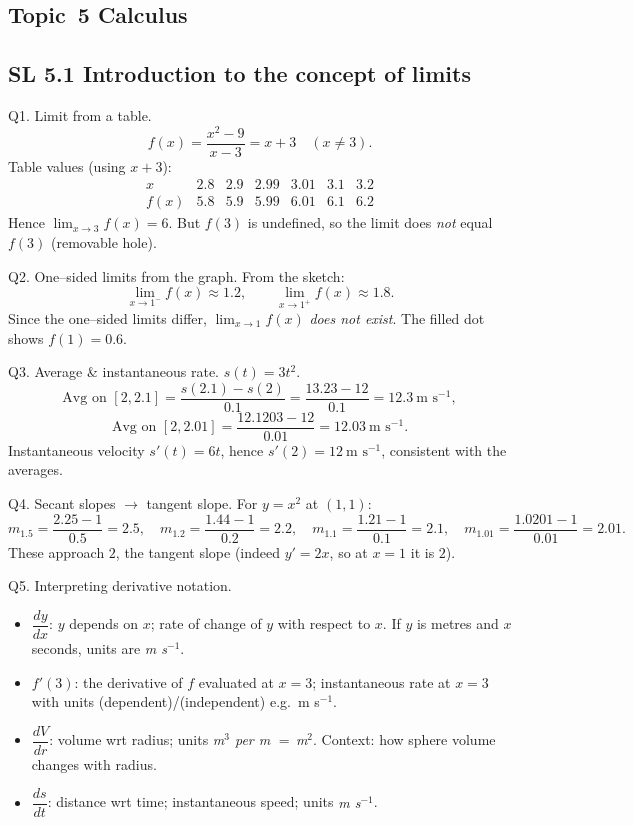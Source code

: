 \documentclass[11pt]{article}
\def\textbf#1{#1}%
\newcommand{\tocsubsection}[1]{\subsection{#1}}
\begin{document}
\tocsubsection{Topic 5 Calculus}
\tocsubsection{SL 5.1 Introduction to the concept of limits}


\begin{solution}
\textbf{Q1. Limit from a table.}
\[
f(x)=\frac{x^{2}-9}{x-3}=x+3\quad(x\ne3).
\]
Table values (using $x+3$):
\[
\begin{array}{c|cccccc}
x & 2.8 & 2.9 & 2.99 & 3.01 & 3.1 & 3.2\\\hline
f(x) & 5.8 & 5.9 & 5.99 & 6.01 & 6.1 & 6.2
\end{array}
\]
Hence $\displaystyle\lim_{x\to3}f(x)=\boxed{6}$.  
But $f(3)$ is undefined, so the limit does \emph{not} equal $f(3)$ (removable hole).
\end{solution}

\begin{solution}
\textbf{Q2. One–sided limits from the graph.}
From the sketch:
\[
\lim_{x\to1^-}f(x)\approx \boxed{1.2},\qquad
\lim_{x\to1^+}f(x)\approx \boxed{1.8}.
\]
Since the one–sided limits differ, $\displaystyle\lim_{x\to1}f(x)$ \emph{does not exist}.  
The filled dot shows $f(1)=\boxed{0.6}$.
\end{solution}

\begin{solution}
\textbf{Q3. Average \& instantaneous rate.}
$s(t)=3t^{2}$.
\[
\text{Avg on }[2,2.1]=\frac{s(2.1)-s(2)}{0.1}=\frac{13.23-12}{0.1}=\boxed{12.3\ \text{m s}^{-1}},
\]
\[
\text{Avg on }[2,2.01]=\frac{12.1203-12}{0.01}=\boxed{12.03\ \text{m s}^{-1}}.
\]
Instantaneous velocity $s'(t)=6t$, hence $s'(2)=\boxed{12\ \text{m s}^{-1}}$, consistent with the averages.
\end{solution}

\begin{solution}
\textbf{Q4. Secant slopes $\to$ tangent slope.}
For $y=x^{2}$ at $(1,1)$:
\[
m_{1.5}=\frac{2.25-1}{0.5}=2.5,\quad
m_{1.2}=\frac{1.44-1}{0.2}=2.2,\quad
m_{1.1}=\frac{1.21-1}{0.1}=2.1,\quad
m_{1.01}=\frac{1.0201-1}{0.01}=2.01.
\]
These approach $\boxed{2}$, the tangent slope (indeed $y'=2x$, so at $x=1$ it is $2$).
\end{solution}

\begin{solution}
\textbf{Q5. Interpreting derivative notation.}
\begin{itemize}
  \item $\dfrac{dy}{dx}$: $y$ depends on $x$; rate of change of $y$ with respect to $x$. If $y$ is metres and $x$ seconds, units are \emph{m s$^{-1}$}.
  \item $f'(3)$: the derivative of $f$ evaluated at $x=3$; instantaneous rate at $x=3$ with units (dependent)/(independent) e.g.\ m s$^{-1}$.
  \item $\dfrac{dV}{dr}$: volume wrt radius; units \emph{m$^{3}$ per m} $=\,$\emph{m$^{2}$}. Context: how sphere volume changes with radius.
  \item $\dfrac{ds}{dt}$: distance wrt time; instantaneous speed; units \emph{m s$^{-1}$}.
\end{itemize}
\end{solution}
\end{document}
